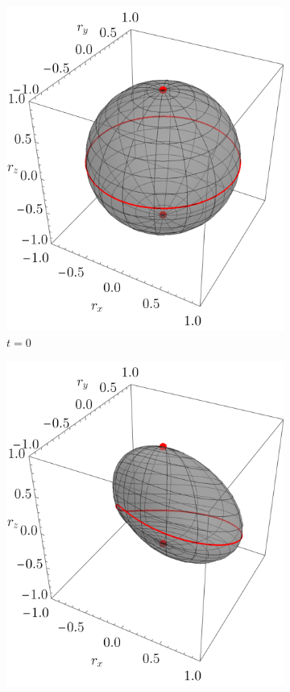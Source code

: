     \begin{figure}[ht!]
      \centering
      \begin{subfigure}{0.32\textwidth}
        \centering
        \includegraphics[width=0.9\linewidth]{chapter3/figures_toy/CNOT_p=0.5_t=0._r=0.9.png}
        \caption{$t=0$}
      \end{subfigure}%
      \begin{subfigure}{0.32\textwidth}
        \centering
        \includegraphics[width=0.9\linewidth]{chapter3/figures_toy/CNOT_p=0.5_t=0.5_r=0.9.png}

\end{subfigure}
\end{figure}
